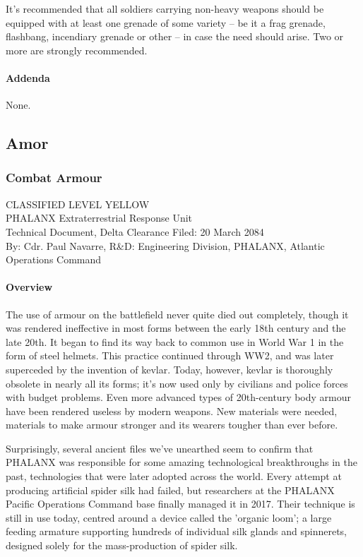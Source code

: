 It's recommended that all soldiers carrying non-heavy weapons should be equipped with at least one grenade of some variety -- be it a frag grenade, flashbang, incendiary grenade or other -- in case the need should arise. Two or more are strongly recommended.
\paragraph*{Addenda}
None.
\subsection{Amor}
\subsubsection*{Combat Armour}
CLASSIFIED LEVEL YELLOW\\
PHALANX Extraterrestrial Response Unit\\
Technical Document, Delta Clearance
Filed: 20 March 2084\\
By: Cdr. Paul Navarre, R&D: Engineering Division, PHALANX, Atlantic Operations Command\\
\paragraph*{Overview}
The use of armour on the battlefield never quite died out completely, though it was rendered ineffective in most forms between the early 18th century and the late 20th. It began to find its way back to common use in World War 1 in the form of steel helmets. This practice continued through WW2, and was later superceded by the invention of kevlar. Today, however, kevlar is thoroughly obsolete in nearly all its forms; it's now used only by civilians and police forces with budget problems. Even more advanced types of 20th-century body armour have been rendered useless by modern weapons. New materials were needed, materials to make armour stronger and its wearers tougher than ever before.

Surprisingly, several ancient files we've unearthed seem to confirm that PHALANX was responsible for some amazing technological breakthroughs in the past, technologies that were later adopted across the world. Every attempt at producing artificial spider silk had failed, but researchers at the PHALANX Pacific Operations Command base finally managed it in 2017. Their technique is still in use today, centred around a device called the 'organic loom'; a large feeding armature supporting hundreds of individual silk glands and spinnerets, designed solely for the mass-production of spider silk.

